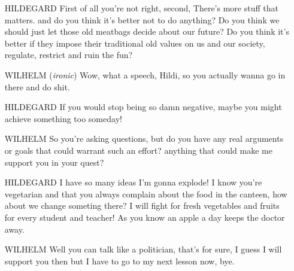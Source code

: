 \documentclass[12pt, letterpaper, twoside]{article}
\begin{document}
\begin{flushleft}
\begin{itemize}
    \item[HILDEGARD]	First of all you're not right, second, There's more stuff that matters.
			and do you think it's better not to do anything? Do you think we should just let
			those old meatbags decide about our future? Do you think it's better if they impose their
			traditional old values on us and our society, regulate, restrict and ruin the fun?

    \item[WILHELM]	(\textit{ironic}) Wow, what a speech, Hildi, so you actually wanna go in there and do shit.

    \item[HILDEGARD]	If you would stop being so damn negative, maybe you might achieve something too someday!

    \item[WILHELM] 	So you're asking questions, but do you have any real arguments or goals that could warrant
			such an effort? anything that could make me support you in your quest?

    \item[HILDEGARD]	I have so many ideas I'm gonna explode! I know you're vegetarian and that you always complain
			about the food in the canteen, how about we change someting there? I will fight for fresh
			vegetables and fruits for every student and teacher! As you know an apple a day keeps the
			doctor away.

    \item[WILHELM] 	Well you can talk like a politician, that's for sure, I guess I will support you then
			but I have to go to my next lesson now, bye.




\end{itemize}

\end{flushleft}
\end{document}
